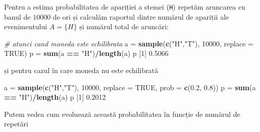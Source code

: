\documentclass[]{article}
\newenvironment{Shaded}{\begin{snugshade}}{\end{snugshade}}
\newcommand{\KeywordTok}[1]{\textcolor[rgb]{0.13,0.29,0.53}{\textbf{#1}}}
\newcommand{\DataTypeTok}[1]{\textcolor[rgb]{0.13,0.29,0.53}{#1}}
\newcommand{\DecValTok}[1]{\textcolor[rgb]{0.00,0.00,0.81}{#1}}
\newcommand{\FloatTok}[1]{\textcolor[rgb]{0.00,0.00,0.81}{#1}}
\newcommand{\StringTok}[1]{\textcolor[rgb]{0.31,0.60,0.02}{#1}}
\newcommand{\CommentTok}[1]{\textcolor[rgb]{0.56,0.35,0.01}{\textit{#1}}}
\newcommand{\OtherTok}[1]{\textcolor[rgb]{0.56,0.35,0.01}{#1}}
\newcommand{\OperatorTok}[1]{\textcolor[rgb]{0.81,0.36,0.00}{\textbf{#1}}}
\newcommand{\NormalTok}[1]{#1}
\begin{document}
Pentru a estima probabilitatea de apariției a stemei (\texttt{H})
repetăm aruncarea cu banul de \(10000\) de ori și calculăm raportul
dintre numărul de apariții ale evenimentului \(A=\{H\}\) și numărul
total de aruncări:

\begin{Shaded}
\begin{Highlighting}[]
\CommentTok{# atunci cand moneda este echilibrata}
\NormalTok{a =}\StringTok{ }\KeywordTok{sample}\NormalTok{(}\KeywordTok{c}\NormalTok{(}\StringTok{"H"}\NormalTok{,}\StringTok{"T"}\NormalTok{), }\DecValTok{10000}\NormalTok{, }\DataTypeTok{replace =} \OtherTok{TRUE}\NormalTok{)}
\NormalTok{p =}\StringTok{ }\KeywordTok{sum}\NormalTok{(a }\OperatorTok{==}\StringTok{ "H"}\NormalTok{)}\OperatorTok{/}\KeywordTok{length}\NormalTok{(a)}
\NormalTok{p}
\NormalTok{[}\DecValTok{1}\NormalTok{] }\FloatTok{0.5066}
\end{Highlighting}
\end{Shaded}

și pentru cazul în care moneda nu este echilibrată

\begin{Shaded}
\begin{Highlighting}[]
\NormalTok{a =}\StringTok{ }\KeywordTok{sample}\NormalTok{(}\KeywordTok{c}\NormalTok{(}\StringTok{"H"}\NormalTok{,}\StringTok{"T"}\NormalTok{), }\DecValTok{10000}\NormalTok{, }\DataTypeTok{replace =} \OtherTok{TRUE}\NormalTok{, }\DataTypeTok{prob =} \KeywordTok{c}\NormalTok{(}\FloatTok{0.2}\NormalTok{, }\FloatTok{0.8}\NormalTok{))}
\NormalTok{p =}\StringTok{ }\KeywordTok{sum}\NormalTok{(a }\OperatorTok{==}\StringTok{ "H"}\NormalTok{)}\OperatorTok{/}\KeywordTok{length}\NormalTok{(a)}
\NormalTok{p}
\NormalTok{[}\DecValTok{1}\NormalTok{] }\FloatTok{0.2012}
\end{Highlighting}
\end{Shaded}

Putem vedea cum evoluează această probabilitatea în funcție de numărul
de repetări
\end{document}

